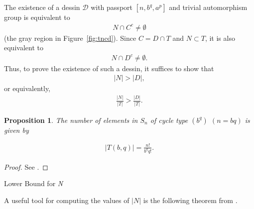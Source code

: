 \documentclass[12pt,reqno]{amsart}
\makeatletter
\newif\if@noindentafterheading
\renewcommand\subsection{\@startsection{subsection}{2}{\z@}%
  {-2.5ex \@plus -.3ex \@minus -.2ex}%
  {1.5ex \@plus .2ex}%
  {\normalfont\bfseries}%
}
\let\orig@subsection\subsection
\renewcommand\subsection{%
  \@ifstar{\subsection@star}{\subsection@nostar}%
}
\newcommand\subsection@nostar{%
  \@ifnextchar[{\subsection@opt}{\subsection@noopt}%
}
\newcommand\subsection@opt[2][]{%
  \global\@noindentafterheadingtrue
  \orig@subsection[#1]{#2}%
  \global\@noindentafterheadingfalse
}
\newcommand\subsection@noopt[1]{%
  \global\@noindentafterheadingtrue
  \orig@subsection{#1}%
  \global\@noindentafterheadingfalse
}
\newcommand\subsection@star[1]{%
  \global\@noindentafterheadingtrue
  \orig@subsection*{#1}%
  \global\@noindentafterheadingfalse
}
\newcommand{\msD}{\mathscr{D}}
\newcommand{\OL}{\vspace{5mm}}							%
\newcommand{\f}[2]{\frac{#1}{#2}}							%
\newcommand{\vt}[1]{\left\lvert #1 \right\rvert}					%
\theoremstyle{mythmstyle}
\newtheorem{prop}[lemma]{Proposition}
\theoremstyle{mydefstyle}
\newcommand{\figref}[1]{Figure~\ref{#1}}
\numberwithin{equation}{section}
\makeatother
\begin{document}
The existence of a dessin $\msD$ with passport $[n, b^{q}, a^{p}]$ and trivial automorphism group
is equivalent to
\begin{align}
N \cap C^{c} \ne \emptyset
\end{align}
(the gray region in \figref{fig:tncd}). Since $C  = D \cap T$ and $N \subset T$, it is also equivalent to
\begin{align}
N \cap D^{c} \ne \emptyset.
\end{align}
Thus, to prove the existence of such a dessin,
it suffices to show that
\begin{align}
\vt{N} > \vt{D},
\end{align}
or equivalently,
\begin{align}
\f{\vt{N}}{\vt{T}} > \f{\vt{D}}{\vt{T}}.
\end{align}

\begin{prop}
\label{prop:tbq}
The number of elements in $S_{n}$ of cycle type $(b^{q})$ $(n = bq)$ is given by

\begin{align}
\vt{T(b, q)} = \f{n!}{b^{q}q!}.
\end{align}
\end{prop}

\begin{proof}
See \cite[Proposition~3.1]{Ohnishi26}.
\end{proof}
\OL

\subsection{Lower Bound for \textit{N}}

A useful tool for computing the values of $\vt{N}$ is the following theorem from \cite{Goupil98}.
\end{document}
